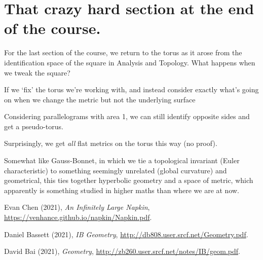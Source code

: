 \documentclass[11pt]{scrartcl}
\begin{document}


\section{That crazy hard section at the end of the course.}

For the last section of the course, we return to the torus as it arose from the identification space of the square in Analysis and Topology. What happens when we tweak the square?

If we `fix' the torus we're working with, and instead consider exactly what's going on when we change the metric but not the underlying surface

Considering parallelograms with area 1, we can still identify opposite sides and get a pseudo-torus.

Surprisingly, we get \textit{all} flat metrics on the torus this way (no proof).

Somewhat like Gauss-Bonnet, in which we tie a topological invariant (Euler characteristic) to something seemingly unrelated (global curvature) and geometrical, this ties together hyperbolic geometry and a space of metric, which apparently is something studied in higher maths than where we are at now.

\begin{thebibliography}{9}
Evan Chen (2021), \emph{An Infinitely Large Napkin}, \url{https://venhance.github.io/napkin/Napkin.pdf}.

Daniel Bassett (2021), \emph{IB Geometry}, \url{http://db808.user.srcf.net/Geometry.pdf}.

David Bai (2021), \emph{Geometry}, \url{http://zb260.user.srcf.net/notes/IB/geom.pdf}.



\end{thebibliography}
\end{document}

